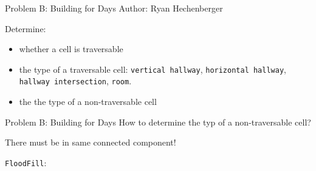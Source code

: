 \begin{frame}{Problem B: Building for Days}
\small Author: Ryan Hechenberger

Determine:
\begin{itemize}
  \item whether a cell is traversable
  \item the type of a traversable cell: \texttt{vertical hallway},
  \texttt{horizontal hallway}, \texttt{hallway intersection},
  \texttt{room}.
  \item the the type of a non-traversable cell
\end{itemize}
\end{frame}

\begin{frame}{Problem B: Building for Days}
 How to determine the typ of a non-traversable cell?

 There must be in same connected component!

 {
  \texttt{FloodFill}:
  \inputminted[linenos=true, fontsize=\small, bgcolor=mygray]{python}{./src/floodfill.py}
}
\end{frame}
